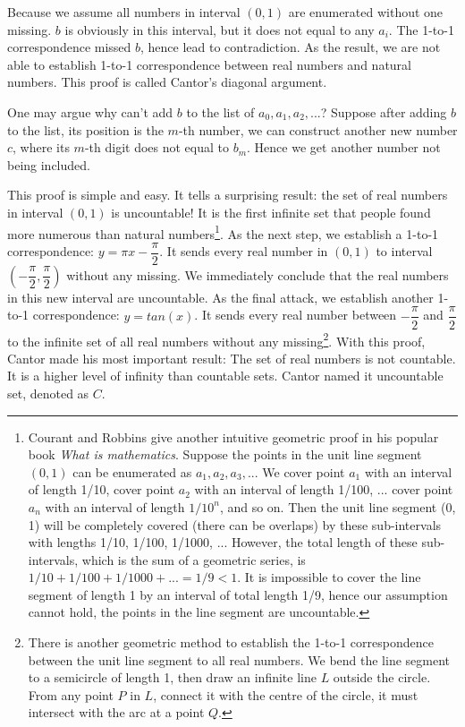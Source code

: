 \documentclass{article}
\begin{document}
Because we assume all numbers in interval $(0, 1)$ are enumerated without one missing. $b$ is obviously in this interval, but it does not equal to any $a_i$. The 1-to-1 correspondence missed $b$, hence lead to contradiction. As the result, we are not able to establish 1-to-1 correspondence between real numbers and natural numbers. This proof is called Cantor's diagonal argument.

One may argue why can't add $b$ to the list of $a_0, a_1, a_2, ...$? Suppose after adding $b$ to the list, its position is the $m$-th number, we can construct another new number $c$, where its $m$-th digit does not equal to $b_m$. Hence we get another number not being included.

This proof is simple and easy. It tells a surprising result: the set of real numbers in interval $(0, 1)$ is uncountable! It is the first infinite set that people found more numerous than natural numbers\footnote{Courant and Robbins give another intuitive geometric proof in his popular book {\em What is mathematics}. Suppose the points in the unit line segment $(0, 1)$ can be enumerated as $a_1, a_2, a_3, ...$ We cover point $a_1$ with an interval of length 1/10, cover point $a_2$ with an interval of length 1/100, ... cover point $a_n$ with an interval of length $1/10^n$, and so on. Then the unit line segment (0, 1) will be completely covered (there can be overlaps) by these sub-intervals with lengths 1/10, 1/100, 1/1000, ... However, the total length of these sub-intervals, which is the sum of a geometric series, is $1/10 + 1/100 + 1/1000 + ... = 1/9 < 1$. It is impossible to cover the line segment of length 1 by an interval of total length 1/9, hence our assumption cannot hold, the points in the line segment are uncountable\cite{Courant1969}.}. As the next step, we establish a 1-to-1 correspondence: $y = \pi x - \dfrac{\pi}{2}$. It sends every real number in $(0, 1)$ to interval $(-\dfrac{\pi}{2}, \dfrac{\pi}{2})$ without any missing. We immediately conclude that the real numbers in this new interval are uncountable. As the final attack, we establish another 1-to-1 correspondence: $ y = tan(x)$. It sends every real number between $-\dfrac{\pi}{2}$ and $\dfrac{\pi}{2}$ to the infinite set of all real numbers without any missing\footnote{There is another geometric method to establish the 1-to-1 correspondence between the unit line segment to all real numbers. We bend the line segment to a semicircle of length 1, then draw an infinite line $L$ outside the circle. From any point $P$ in $L$, connect it with the centre of the circle, it must intersect with the arc at a point $Q$.}. With this proof, Cantor made his most important result: The set of real numbers is not countable. It is a higher level of infinity than countable sets. Cantor named it uncountable set, denoted as $C$.
\end{document}

